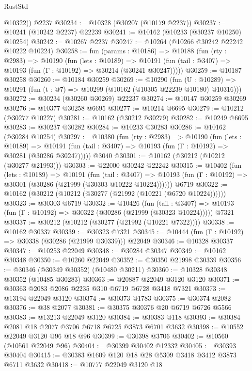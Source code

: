 \begin{lexlean}{RustStd}
\begin{coremodule}
        @10322))
    @2237
@30234 := @10328 (@30207 (@10179 @2237))
@30237 := @10241 (@10242 @2237) @22239
@30241 := @10162 (@10233 (@30237 @10250) @10254)
@30242 := @10267 @2237
@30247 := @10264 (@10266 @30242 @22242 @10222 @10224)
@30258 := fun (params : @10186) =>
  @10188
    (fun (rty : @2983) =>
    @10190
      (fun (lets : @10189) =>
      @10191 (fun (tail : @3407) => @10193 (fun (Γ : @10192) => @30214 (@30241 @30247)))))
@30259 := @10187 @30258
@30260 := @10184 @30259
@30269 := @10290
    (fun (U : @10289) => @10291 (fun (t : @7) => @10299 (@10162 (@10305 @22239 @10180) @10316)))
@30272 := @30234 (@30260 @30269) @22237
@30274 := @10147 @30259 @30269
@30276 := @10377 @30258 @6695
@30277 := @10214 @6695
@30279 := @10212 (@30277 @10227)
@30281 := @10162 (@30212 @30279)
@30282 := @10249 @6695
@30283 := @30237 @30282
@30284 := @10233 @30283
@30286 := @10162 (@30284 @10254)
@30297 := @10380
    (fun (rty : @2983) =>
    @10190
      (fun (lets : @10189) =>
      @10191 (fun (tail : @3407) => @10193 (fun (Γ : @10192) => @30281 (@30286 @30247)))))
    @3040
@30301 := @10162 (@30212 (@10212 (@30277 @21993)))
@30303 := @22000 @30242 @22242
@30315 := @10402
    (fun (lets : @10189) =>
    @10191
      (fun (tail : @3407) =>
      @10193 (fun (Γ : @10192) => @30301 (@30286 (@21999 (@30303 @10222 @10224))))))
    @6719
@30322 := @10162 (@30212 (@10212 (@30277 (@21992 (@10221 (@6720 @10224))))))
@30323 := @30303 @6719
@30332 := @10426
    (fun (tail : @3407) => @10193 (fun (Γ : @10192) => @30322 (@30286 (@21999 (@30323 @10224)))))
    @7321
@30337 := @30212 (@10212 (@30277 (@21992 (@10221 @7322))))
@30338 := @10162 @30337
@30339 := @30323 @7321
@30345 := @10444 (fun (Γ : @10192) => @30338 (@30286 (@21999 @30339))) @22049
@30346 := @10328 @30337
@30347 := @10253 @22049
@30348 := @30284 @30347
@30349 := @10162 @30348
@30350 := @10260 @22049
@30352 := @30350 @21998 @30339
@30356 := @30346 (@30349 @30352) (@10480 @30211)
@30360 := @10328 @30348 @30352 (@10485 @30283)
@30363 := @20887 @22049 @3120 @3120
@30371 := @30363 @2083 @2086 @2235 @310 @6719 @6728 @3418 @7321
@30373 := @13194 @22049 @3120
@30374 := @30373 @1783
@30375 := @30374 @2082
@30376 := @38 @2077
@30381 := @30375 @30376 @20 @6719 @6726 @5566
@30383 := @13213 @22049 @3120
@30384 := @30383 @118
@30393 := @30384 @2081 @18 @2077 @3706 @6718 @6725 @3873 @6701 @3632
@30398 := @10552 @22049 @3120 @96 @18 @96
@30399 := @30398 @3706
@30402 := @10560 (@10561 @22049 @96)
@30404 := @30399 @30402 @12332
@30405 := @30393 @30404
@30415 := @30383 @1609 @120 @18 @28 @5309 @3418 @3412 @3873 @6711 @3632
@30418 := @10777 @22049 @3120 @18

\end{coremodule}
\end{lexlean}
